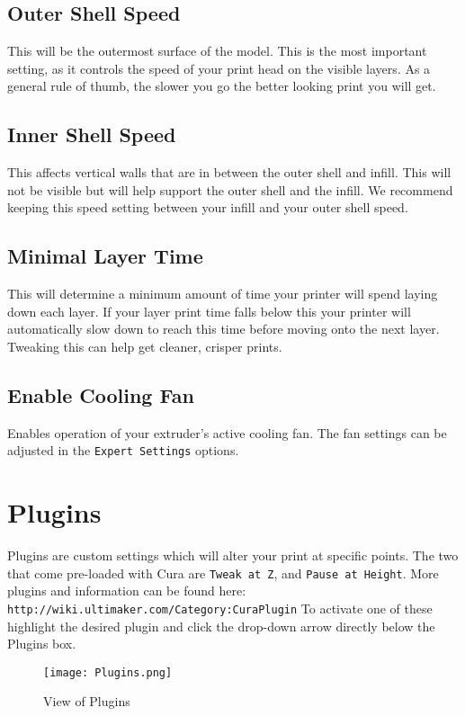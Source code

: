 \subsection{Outer Shell Speed}
This will be the outermost surface of the model. This is the most important setting, as it controls the speed of your print head on the visible layers. As a general rule of thumb, the slower you go the better looking print you will get. 

\subsection{Inner Shell Speed}
This affects vertical walls that are in between the outer shell and infill. This will not be visible but will help support the outer shell and the infill. We recommend keeping this speed setting between your infill and your outer shell speed.

\subsection{Minimal Layer Time}
This will determine a minimum amount of time your printer will spend laying down each layer. If your layer print time falls below this your printer will automatically slow down to reach this time before moving onto the next layer. Tweaking this can help get cleaner, crisper prints.

\subsection{Enable Cooling Fan}
Enables operation of your extruder's active cooling fan. The fan settings can be adjusted in the \texttt{Expert Settings} options.

\section{Plugins}
Plugins are custom settings which will alter your print at specific points. The two that come pre-loaded with Cura are \texttt{Tweak at Z}, and \texttt{Pause at Height}. More plugins and information can be found here: \texttt{http://wiki.ultimaker.com/Category:CuraPlugin} To activate one of these highlight the desired plugin and click the drop-down arrow directly below the Plugins box. 
\begin{figure}[H]
\centering
\texttt{[image: Plugins.png]}
\caption{View of Plugins}
\label{fig:Plugins}
\end{figure}

